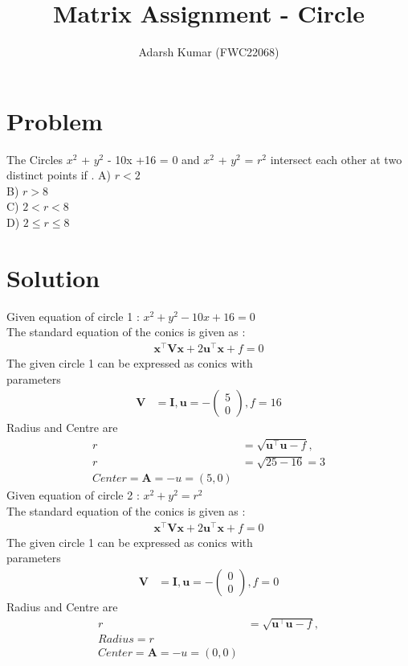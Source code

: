 \documentclass[journal,12pt,twocolumn]{IEEEtran}
\title{\mytitle}
\title{
Matrix Assignment - Circle
}
\author{Adarsh Kumar (FWC22068)}
\newcommand{\myvec}[1]{\ensuremath{\begin{pmatrix}#1\end{pmatrix}}}
\let\vec\mathbf
\begin{document}
\maketitle
\tableofcontents
\bigskip


\section{\textbf{Problem}}
The Circles ${x}^2$ + ${y}^2$ - 10x +16 = 0  and \hspace{5mm} ${x}^2$ + ${y}^2$ = ${r}^2$  intersect each other at two distinct points if .
\linebreak
A) $r<2$ \\ B) $r>8$\\ C) $2<r<8$ \\D) $2 \le r \le 8$
\section{\textbf{Solution}}

Given equation of circle 1 : $x^2+y^2-10x+16=0$\\
The standard equation of the conics is given as :
\begin{align}
\vec{x}^{\top}\vec{V}\vec{x}+2\vec{u}^{\top}\vec{x}+f=0
\end{align}
The given circle 1 can be expressed as conics with \\parameters
\begin{align}
	\vec{V} &= \vec{I}, \vec{u} = -\myvec{5 \\0}, f = 16
	\end{align}
	Radius and Centre are
\begin{align}
	r &=\sqrt{{\vec{u}^{\top}\vec{u}}-f },\\
	r &=\sqrt{25 -16} =3\\
	Center = \vec{A}=-u = (5,0)
    \end{align}
    Given equation of circle 2 : $x^2+y^2=r^2$\\
    The standard equation of the conics is given as :
\begin{align}
\vec{x}^{\top}\vec{V}\vec{x}+2\vec{u}^{\top}\vec{x}+f=0
\end{align}
The given circle 1 can be expressed as conics with \\parameters
\begin{align}
	\vec{V} &= \vec{I}, \vec{u} = -\myvec{0 \\0}, f = 0
	\end{align}
	Radius and Centre are
	\begin{align}
	r &=\sqrt{{\vec{u}^{\top}\vec{u}}-f },\\
	 Radius = r\\
	Center = \vec{A}=-u =  (0,0)  
	\end{align}
\end{document}
